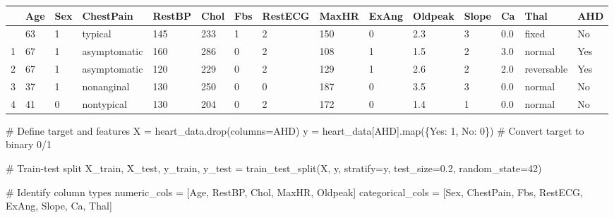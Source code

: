 \documentclass[
  letterpaper,
  DIV=11,
  numbers=noendperiod]{scrreprt}
\newenvironment{Shaded}{\begin{snugshade}}{\end{snugshade}}
\newcommand{\BuiltInTok}[1]{\textcolor[rgb]{0.00,0.23,0.31}{#1}}
\newcommand{\CommentTok}[1]{\textcolor[rgb]{0.37,0.37,0.37}{#1}}
\newcommand{\DecValTok}[1]{\textcolor[rgb]{0.68,0.00,0.00}{#1}}
\newcommand{\FloatTok}[1]{\textcolor[rgb]{0.68,0.00,0.00}{#1}}
\newcommand{\NormalTok}[1]{\textcolor[rgb]{0.00,0.23,0.31}{#1}}
\newcommand{\OperatorTok}[1]{\textcolor[rgb]{0.37,0.37,0.37}{#1}}
\newcommand{\StringTok}[1]{\textcolor[rgb]{0.13,0.47,0.30}{#1}}
\begin{document}
\begin{longtable}[]{@{}lllllllllllllll@{}}
\toprule\noalign{}
& Age & Sex & ChestPain & RestBP & Chol & Fbs & RestECG & MaxHR & ExAng
& Oldpeak & Slope & Ca & Thal & AHD \\
\midrule\noalign{}
\endhead
\bottomrule\noalign{}
\endlastfoot
0 & 63 & 1 & typical & 145 & 233 & 1 & 2 & 150 & 0 & 2.3 & 3 & 0.0 &
fixed & No \\
1 & 67 & 1 & asymptomatic & 160 & 286 & 0 & 2 & 108 & 1 & 1.5 & 2 & 3.0
& normal & Yes \\
2 & 67 & 1 & asymptomatic & 120 & 229 & 0 & 2 & 129 & 1 & 2.6 & 2 & 2.0
& reversable & Yes \\
3 & 37 & 1 & nonanginal & 130 & 250 & 0 & 0 & 187 & 0 & 3.5 & 3 & 0.0 &
normal & No \\
4 & 41 & 0 & nontypical & 130 & 204 & 0 & 2 & 172 & 0 & 1.4 & 1 & 0.0 &
normal & No \\
\end{longtable}

\begin{Shaded}
\begin{Highlighting}[]
\CommentTok{\# Define target and features}
\NormalTok{X }\OperatorTok{=}\NormalTok{ heart\_data.drop(columns}\OperatorTok{=}\StringTok{\textquotesingle{}AHD\textquotesingle{}}\NormalTok{)}
\NormalTok{y }\OperatorTok{=}\NormalTok{ heart\_data[}\StringTok{\textquotesingle{}AHD\textquotesingle{}}\NormalTok{].}\BuiltInTok{map}\NormalTok{(\{}\StringTok{\textquotesingle{}Yes\textquotesingle{}}\NormalTok{: }\DecValTok{1}\NormalTok{, }\StringTok{\textquotesingle{}No\textquotesingle{}}\NormalTok{: }\DecValTok{0}\NormalTok{\})  }\CommentTok{\# Convert target to binary 0/1}

\CommentTok{\# Train{-}test split}
\NormalTok{X\_train, X\_test, y\_train, y\_test }\OperatorTok{=}\NormalTok{ train\_test\_split(X, y, stratify}\OperatorTok{=}\NormalTok{y, test\_size}\OperatorTok{=}\FloatTok{0.2}\NormalTok{, random\_state}\OperatorTok{=}\DecValTok{42}\NormalTok{)}

\CommentTok{\# Identify column types}
\NormalTok{numeric\_cols }\OperatorTok{=}\NormalTok{ [}\StringTok{\textquotesingle{}Age\textquotesingle{}}\NormalTok{, }\StringTok{\textquotesingle{}RestBP\textquotesingle{}}\NormalTok{, }\StringTok{\textquotesingle{}Chol\textquotesingle{}}\NormalTok{, }\StringTok{\textquotesingle{}MaxHR\textquotesingle{}}\NormalTok{, }\StringTok{\textquotesingle{}Oldpeak\textquotesingle{}}\NormalTok{]}
\NormalTok{categorical\_cols }\OperatorTok{=}\NormalTok{ [}\StringTok{\textquotesingle{}Sex\textquotesingle{}}\NormalTok{, }\StringTok{\textquotesingle{}ChestPain\textquotesingle{}}\NormalTok{, }\StringTok{\textquotesingle{}Fbs\textquotesingle{}}\NormalTok{, }\StringTok{\textquotesingle{}RestECG\textquotesingle{}}\NormalTok{, }\StringTok{\textquotesingle{}ExAng\textquotesingle{}}\NormalTok{, }\StringTok{\textquotesingle{}Slope\textquotesingle{}}\NormalTok{, }\StringTok{\textquotesingle{}Ca\textquotesingle{}}\NormalTok{, }\StringTok{\textquotesingle{}Thal\textquotesingle{}}\NormalTok{]}
\end{Highlighting}
\end{Shaded}
\end{document}
